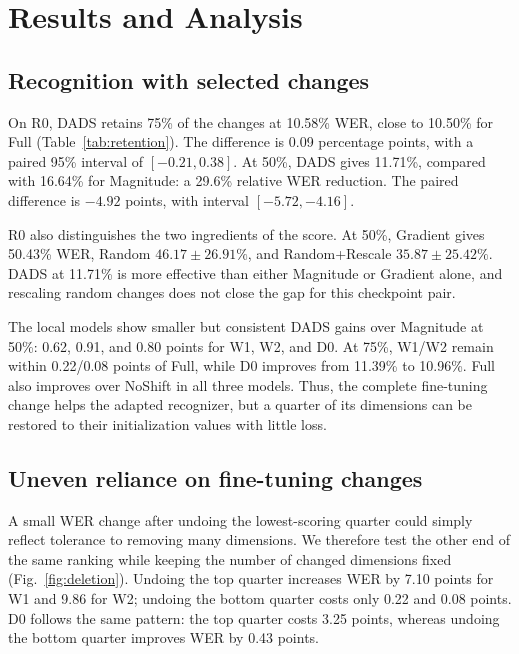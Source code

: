 \documentclass{article}
\begin{document}
\section{Results and Analysis}
\label{sec:results}
\subsection{Recognition with selected changes}
On R0, DADS retains 75\% of the changes at 10.58\% WER, close to 10.50\% for Full (Table~\ref{tab:retention}). The difference is 0.09 percentage points, with a paired 95\% interval of $[-0.21,0.38]$. At 50\%, DADS gives 11.71\%, compared with 16.64\% for Magnitude: a 29.6\% relative WER reduction. The paired difference is $-4.92$ points, with interval $[-5.72,-4.16]$.

\begin{table}[t]
\centering
\caption{Test WER (\%) after retaining selected changes. R0 uses a separate reference checkpoint; W1/W2/D0 use their fine-tuning initialization. Full and NoShift retain all and none of the changes, respectively.}
\label{tab:retention}

\end{table}

R0 also distinguishes the two ingredients of the score. At 50\%, Gradient gives 50.43\% WER, Random $46.17\pm26.91\%$, and Random+Rescale $35.87\pm25.42\%$. DADS at 11.71\% is more effective than either Magnitude or Gradient alone, and rescaling random changes does not close the gap for this checkpoint pair.

The local models show smaller but consistent DADS gains over Magnitude at 50\%: 0.62, 0.91, and 0.80 points for W1, W2, and D0. At 75\%, W1/W2 remain within 0.22/0.08 points of Full, while D0 improves from 11.39\% to 10.96\%. Full also improves over NoShift in all three models. Thus, the complete fine-tuning change helps the adapted recognizer, but a quarter of its dimensions can be restored to their initialization values with little loss.

\subsection{Uneven reliance on fine-tuning changes}
A small WER change after undoing the lowest-scoring quarter could simply reflect tolerance to removing many dimensions. We therefore test the other end of the same ranking while keeping the number of changed dimensions fixed (Fig.~\ref{fig:deletion}). Undoing the top quarter increases WER by 7.10 points for W1 and 9.86 for W2; undoing the bottom quarter costs only 0.22 and 0.08 points. D0 follows the same pattern: the top quarter costs 3.25 points, whereas undoing the bottom quarter improves WER by 0.43 points.
\end{document}

